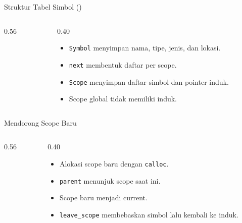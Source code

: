 \documentclass[aspectratio=169,10pt,t]{beamer}
\begin{document}
\begin{frame}[fragile]{Struktur Tabel Simbol ()}
  \begin{columns}[T,onlytextwidth]
    \begin{column}{0.56\textwidth}
      
    \end{column}
    \begin{column}{0.40\textwidth}
      \begin{itemize}
        \item \texttt{Symbol} menyimpan nama, tipe, jenis, dan lokasi.
        \item \texttt{next} membentuk daftar per scope.
        \item \texttt{Scope} menyimpan daftar simbol dan pointer induk.
        \item Scope global tidak memiliki induk.
      \end{itemize}
    \end{column}
  \end{columns}
\end{frame}

\begin{frame}[fragile]{Mendorong Scope Baru}
  \begin{columns}[T,onlytextwidth]
    \begin{column}{0.56\textwidth}
      
    \end{column}
    \begin{column}{0.40\textwidth}
      \begin{itemize}
        \item Alokasi scope baru dengan \texttt{calloc}.
        \item \texttt{parent} menunjuk scope saat ini.
        \item Scope baru menjadi current.
        \item \texttt{leave\_scope} membebaskan simbol lalu kembali
              ke induk.
      \end{itemize}
    \end{column}
  \end{columns}
\end{frame}
\end{document}
